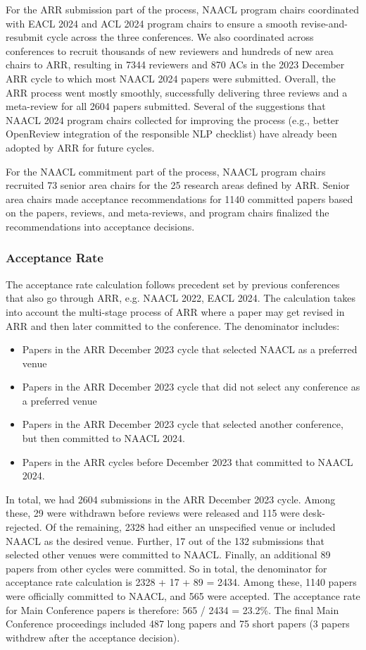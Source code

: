 For the ARR submission part of the process, NAACL program chairs coordinated with EACL 2024 and ACL 2024 program chairs to ensure a smooth revise-and-resubmit cycle across the three conferences. We also coordinated across conferences to recruit thousands of new reviewers and hundreds of new area chairs to ARR, resulting in 7344 reviewers and 870 ACs in the 2023 December ARR cycle to which most NAACL 2024 papers were submitted. Overall, the ARR process went mostly smoothly, successfully delivering three reviews and a meta-review for all 2604 papers submitted. Several of the suggestions that NAACL 2024 program chairs collected for improving the process (e.g., better OpenReview integration of the responsible NLP checklist) have already been adopted by ARR for future cycles.

For the NAACL commitment part of the process, NAACL program chairs recruited 73 senior area chairs for the 25 research areas defined by ARR. Senior area chairs made acceptance recommendations for 1140 committed papers based on the papers, reviews, and meta-reviews, and program chairs finalized the recommendations into acceptance decisions.

\subsubsection*{Acceptance Rate}
The acceptance rate calculation follows precedent set by previous conferences that also go through ARR, e.g. NAACL 2022, EACL 2024. The calculation takes into account the multi-stage process of ARR where a paper may get revised in ARR and then later committed to the conference. The denominator includes:
\begin{itemize}
\setlength\parskip{0em}
\setlength\itemsep{0.3em}
\item Papers in the ARR December 2023 cycle that selected NAACL as a preferred venue
\item Papers in the ARR December 2023 cycle that did not select any conference as a preferred venue
\item Papers in the ARR December 2023 cycle that selected another conference, but then committed to NAACL 2024.
\item Papers in the ARR cycles before December 2023 that committed to NAACL 2024.
\end{itemize}

In total, we had 2604 submissions in the ARR December 2023 cycle. Among these, 29 were withdrawn before reviews were released and 115 were desk-rejected. Of the remaining, 2328 had either an unspecified venue or included NAACL as the desired venue. Further, 17 out of the 132 submissions that selected other venues were committed to NAACL. Finally, an additional 89 papers from other cycles were committed. So in total, the denominator for acceptance rate calculation is 2328 + 17 + 89 = 2434. Among these, 1140 papers were officially committed to NAACL, and 565 were accepted. The acceptance rate for Main Conference papers is therefore: 565 / 2434 = 23.2\%. The final Main Conference proceedings included 487 long papers and 75 short papers (3 papers withdrew after the acceptance decision).

